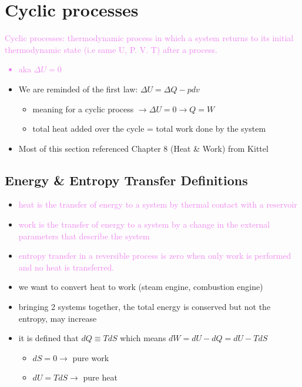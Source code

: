 
\section{Cyclic processes}

\textcolor{violet}{Cyclic processes: thermodynamic process in which a system returns to its initial
	thermodynamic state (i.e same U, P. V. T) after a process.
	\begin{itemize}
		\item aka $\Delta U = 0$
	\end{itemize}
}
\begin{itemize}
	\item We are reminded of the first law: $\Delta U = \Delta Q - p dv$
	      \begin{itemize}
		      \item meaning for a cyclic process  $\rightarrow \Delta U = 0 \rightarrow Q = W$
		      \item total heat added over the cycle = total work done by the system
	      \end{itemize}
	\item Most of this section referenced Chapter 8 (Heat \& Work) from Kittel
\end{itemize}


\subsection{Energy \& Entropy Transfer Definitions}
\begin{itemize}
	\item \textcolor{violet}{heat is the transfer of energy to a system by thermal contact
		      with a reservoir}
	\item \textcolor{violet}{work is the transfer of energy to a system by a change in the
		      external parameters that describe the system}
	\item \textcolor{violet}{entropy transfer in a reversible process is zero when only work is
		      performed and no heat is transferred.}
	\item we want to convert heat to work (steam engine, combustion engine)
	\item bringing 2 systems together, the total energy is conserved but not the entropy,
	      may increase
	\item it is defined that $dQ \equiv T dS$ which means $dW = dU - dQ = dU - TdS$
	      \begin{itemize}
		      \item $dS = 0 \rightarrow$ pure work
		      \item $dU = TdS \rightarrow$ pure heat
	      \end{itemize}
\end{itemize}


